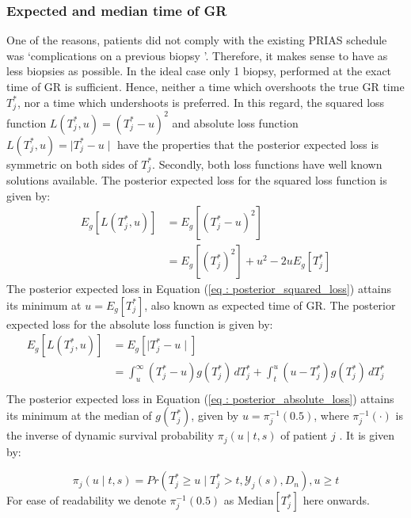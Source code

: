 \subsubsection{Expected and median time of GR}
\label{subsubsec : exp_median_fail_time}
One of the reasons, patients did not comply with the existing PRIAS schedule was \textquoteleft complications on a previous biopsy \textquoteright. Therefore, it makes sense to have as less biopsies as possible. In the ideal case only 1 biopsy, performed at the exact time of GR is sufficient. Hence, neither a time which overshoots the true GR time $T^*_j$, nor a time which undershoots is preferred. In this regard, the squared loss function $L(T^*_j, u) = (T^*_j - u)^2$ and absolute loss function $L(T^*_j, u) = \mid T^*_j - u \mid$ have the properties that the posterior expected loss is symmetric on both sides of $T^*_j$. Secondly, both loss functions have well known solutions available. The posterior expected loss for the squared loss function is given by:
\begin{equation}
\label{eq : posterior_squared_loss}
\begin{split}
E_g[L(T^*_j, u)] &= E_g[(T^*_j - u)^2]\\
&=E_g[(T^*_j)^2] + u^2 -2uE_g[T^*_j]
\end{split}
\end{equation}
The posterior expected loss in Equation (\ref{eq : posterior_squared_loss}) attains its minimum at $u = E_g[T^*_j]$, also known as expected time of GR. The posterior expected loss for the absolute loss function is given by:
\begin{equation}
\label{eq : posterior_absolute_loss}
\begin{split}
E_g[L(T^*_j, u)] &= E_g[\mid T^*_j - u \mid]\\
&= \int_u^\infty (T^*_j - u) g(T^*_j)\, dT^*_j + \int_t^u (u - T^*_j) g(T^*_j)\, dT^*_j\\
\end{split}
\end{equation}
The posterior expected loss in Equation (\ref{eq : posterior_absolute_loss}) attains its minimum at the median of $g(T^*_j)$, given by $u = \pi_j^{-1}(0.5)$, where $\pi_j^{-1}(\cdot)$ is the inverse of dynamic survival probability $\pi_j(u \mid t, s)$ of patient $j$ \citep{rizopoulos2011dynamic}. It is given by:

\begin{equation}
\pi_j(u \mid t, s) = Pr(T^*_j \geq u \mid  T^*_j >t, \mathcal{Y}_j(s), D_n), u \geq t
\end{equation}
For ease of readability we denote $\pi_j^{-1}(0.5)$ as $\text{Median}[T^*_j]$ here onwards.

